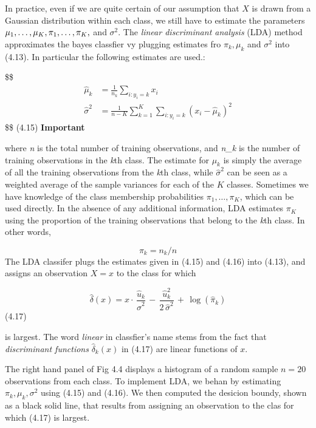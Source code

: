 \documentclass[
  letterpaper,
  DIV=11,
  numbers=noendperiod]{scrreprt}
\begin{document}
{In practice, even if we are quite certain of our assumption that \(X\)
is drawn from a Gaussian distribution within each class, we still have
to estimate the parameters
\(\mu_1, \dots, \mu_K,\space \pi_1,\dots, \pi_K,\) and \(\sigma^2\). The
\emph{linear discriminant analysis} (LDA) method approximates the bayes
classfier vy plugging estimates fro \(\pi_k, \mu_k\) and \(\sigma^2\)
into (4.13). In particular the following estimates are used.:

\$\$ \begin{align}
\hat{\mu}_k &= \frac{1}{n_k}\sum_{i:y_i=k} x_i \\

\hat{\sigma}^2 &= \frac{1}{n-K}\sum^K_{k=1} \sum_{i:y_i =k}(x_i - \hat{\mu}_k)^2

\end{align} \$\$ (4.15) \textbf{Important}

where \emph{n} is the total number of training observations, and
\emph{n\_k} is the number of training observations in the \emph{k}th
class. The estimate for \(\mu_k\) is simply the average of all the
training observations from the \emph{k}th class, while
\(\hat{\sigma}^2\) can be seen as a weighted average of the sample
variances for each of the \(K\) classes. Sometimes we have knowledge of
the class membership probabilities \(\pi_1, \dots, \pi_K\), which can be
used directly. In the absence of any additional information, LDA
estimates \(\pi_K\) using the proportion of the training observations
that belong to the \emph{k}th class. In other words,

\[
\pi_k = n_k /n
\] The LDA classifer plugs the estimates given in (4.15) and (4.16) into
(4.13), and assigns an observation \(X=x\) to the class for which

\[
\hat{\delta}(x) = x \cdot \,\frac{\hat{u}_k}{\hat{\sigma}^2} \,-\,\frac{\hat{u}^2_k}{2\,\hat{\sigma}^2}\,+\,\log(\hat{\pi}_k)
\] (4.17)

is largest. The word \emph{linear} in classfier's name stems from the
fact that \emph{discriminant functions} \(\hat{\delta}_k(x)\) in (4.17)
are linear functions of \(x\).

The right hand panel of Fig 4.4 displays a histogram of a random sample
\(n=20\) observations from each class. To implement LDA, we behan by
estimating \(\pi_k, \mu_k, \sigma^2\) using (4.15) and (4.16). We then
computed the desicion boundy, shown as a black solid line, that results
from assigning an observation to the clas for which (4.17) is largest.

}
\end{document}
